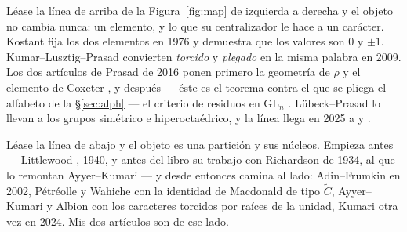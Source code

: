 \documentclass[11pt,a4paper]{article}
\newcommand{\GL}{\mathrm{GL}}
\begin{document}
Léase la línea de arriba de la Figura~\ref{fig:map} de izquierda a derecha y el objeto no cambia
nunca: un elemento, y lo que su centralizador le hace a un carácter. Kostant \cite{Kostant76} fija
los dos elementos en 1976 y demuestra que los valores son $0$ y $\pm1$. Kumar--Lusztig--Prasad
\cite{KLP09} convierten \emph{torcido} y \emph{plegado} en la misma palabra en 2009. Los dos
artículos de Prasad de 2016 ponen primero la geometría de $\rho$ y el elemento de Coxeter
\cite{Prasad16}, y después --- éste es el teorema contra el que se pliega el alfabeto de la
\S\ref{sec:alph} --- el criterio de residuos en $\GL_n$ \cite{Prasad16b}. Lübeck--Prasad \cite{LP20}
lo llevan a los grupos simétrico e hiperoctaédrico, y la línea llega en 2025 a \cite{NPP25} y
\cite{Polo25}.

Léase la línea de abajo y el objeto es una partición y sus núcleos. Empieza antes --- Littlewood
\cite{Li40}, 1940, y antes del libro su trabajo con Richardson de 1934, al que lo remontan
Ayyer--Kumari \cite[\S1]{AK25} --- y desde entonces camina al lado: Adin--Frumkin \cite{AF02} en 2002, Pétréolle
\cite{Petreolle15} y Wahiche \cite{Wahiche23} con la identidad de Macdonald de tipo $\widetilde C$,
Ayyer--Kumari \cite{AK22} y Albion \cite{Alb23} con los caracteres torcidos por raíces de la unidad,
Kumari \cite{Kum24} otra vez en 2024. Mis dos artículos \cite{OP1,OP2} son de ese lado.
\end{document}
